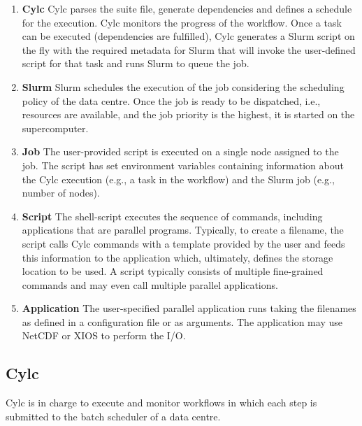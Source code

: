 \documentclass[a4paper]{article}
\begin{document}
\begin{enumerate}
  \item \textbf{Cylc} Cylc parses the suite file, generate dependencies and defines a schedule for the execution.
  Cylc monitors the progress of the workflow.
  Once a task can be executed (dependencies are fulfilled), Cylc generates a Slurm script on the fly with the required metadata for Slurm that will invoke the user-defined script for that task and runs Slurm to queue the job.

  \item \textbf{Slurm} Slurm schedules the execution of the job considering the scheduling policy of the data centre.
  Once the job is ready to be dispatched, i.e., resources are available, and the job priority is the highest, it is started on the supercomputer.

  \item \textbf{Job} The user-provided script is executed on a single node assigned to the job.
  The script has set environment variables containing information about the Cylc execution (e.g., a task in the workflow) and the Slurm job (e.g., number of nodes).

  \item \textbf{Script} The shell-script executes the sequence of commands, including applications that are parallel programs.
  Typically, to create a filename, the script calls Cylc commands with a template provided by the user and feeds this information to the application which, ultimately, defines the storage location to be used.
  A script typically consists of multiple fine-grained commands and may even call multiple parallel applications.

  \item \textbf{Application} The user-specified parallel application runs taking the filenames as defined in a configuration file or as arguments.
  The application may use NetCDF or XIOS to perform the I/O.
\end{enumerate}


\subsection{Cylc}

Cylc is in charge to execute and monitor workflows in which each step is submitted to the batch scheduler of a data centre.
\end{document}
